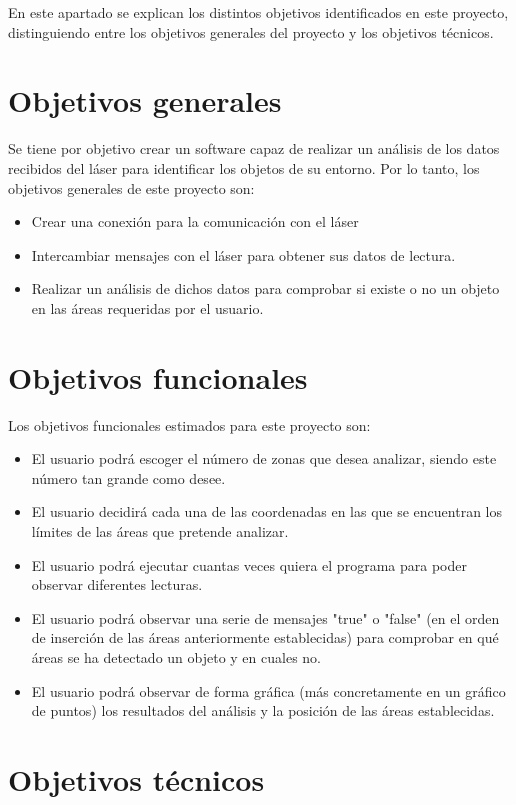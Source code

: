 
En este apartado se explican los distintos objetivos identificados en este proyecto, distinguiendo entre los objetivos generales del proyecto y los objetivos técnicos.

\section{Objetivos generales}

Se tiene por objetivo crear un software capaz de realizar un análisis de los datos recibidos del láser para identificar los objetos de su entorno. Por lo tanto, los objetivos generales de este proyecto son:
\begin{itemize}
	\item Crear una conexión para la comunicación con el láser
	\item Intercambiar mensajes con el láser para obtener sus datos de lectura.
    \item Realizar un análisis de dichos datos para comprobar si existe o no un objeto en las áreas requeridas por el usuario.
\end{itemize} 

\section{Objetivos funcionales}
Los objetivos funcionales estimados para este proyecto son:
\begin{itemize}
	\item El usuario podrá escoger el número de zonas que desea analizar, siendo este número tan grande como desee.
	\item El usuario decidirá cada una de las coordenadas en las que se encuentran los límites de las áreas que pretende analizar.
	\item El usuario podrá ejecutar cuantas veces quiera el programa para poder observar diferentes lecturas.
	\item El usuario podrá observar una serie de mensajes "true" o "false" (en el orden de inserción de las áreas anteriormente establecidas) para comprobar en qué áreas se ha detectado un objeto y en cuales no.
	\item El usuario podrá observar de forma gráfica (más concretamente en un gráfico de puntos) los resultados del análisis y la posición de las áreas establecidas.
\end{itemize}

\section{Objetivos técnicos}

